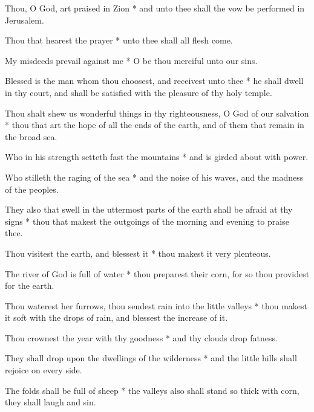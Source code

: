 Thou, O God, art praised in Zion * and unto thee shall the vow be performed in Jerusalem.

Thou that hearest the prayer * unto thee shall all flesh come.

My misdeeds prevail against me * O be thou merciful unto our sins.

Blessed is the man whom thou choosest, and receivest unto thee * he shall dwell in thy court, and shall be satisfied with the pleasure of thy holy temple.

Thou shalt shew us wonderful things in thy righteousness, O God of our salvation * thou that art the hope of all the ends of the earth, and of them that remain in the broad sea.

Who in his strength setteth fast the mountains * and is girded about with power.

Who stilleth the raging of the sea * and the noise of his waves, and the madness of the peoples.

They also that swell in the uttermost parts of the earth shall be afraid at thy signs * thou that makest the outgoings of the morning and evening to praise thee.

Thou visitest the earth, and blessest it * thou makest it very plenteous.

The river of God is full of water * thou preparest their corn, for so thou providest for the earth.

Thou waterest her furrows, thou sendest rain into the little valleys * thou makest it soft with the drops of rain, and blessest the increase of it.

Thou crownest the year with thy goodness * and thy clouds drop fatness.

They shall drop upon the dwellings of the wilderness * and the little hills shall rejoice on every side.

The folds shall be full of sheep * the valleys also shall stand so thick with corn, they shall laugh and sin.